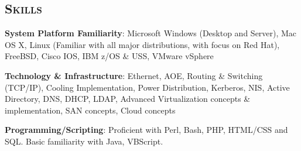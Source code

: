 \begin{resume}

\section{\textsc{Skills}}

\textbf{System Platform Familiarity}: Microsoft Windows (Desktop and Server), Mac OS X, Linux (Familiar with all major distributions, with focus on Red Hat), FreeBSD, Cisco IOS, IBM z/OS \& USS, VMware vSphere

\textbf{Technology \& Infrastructure}: Ethernet, AOE, Routing \& Switching (TCP/IP), Cooling Implementation, Power Distribution, Kerberos, NIS, Active Directory, DNS, DHCP, LDAP, Advanced Virtualization concepts \& implementation, SAN concepts, Cloud concepts

\textbf{Programming/Scripting}: Proficient with Perl, Bash, PHP, HTML/CSS and SQL. Basic familiarity with Java, VBScript.










\end{resume}

